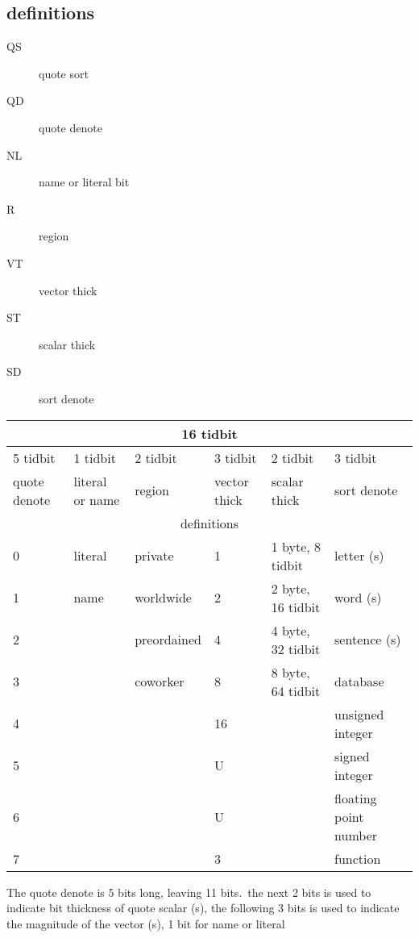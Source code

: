 \subsection{definitions}
\begin{description}
  \item [QS] quote sort 
  \item [QD] quote denote
  \item [NL] name or literal bit
  \item [R] region
  \item [VT] vector thick
  \item [ST] scalar thick
  \item [SD] sort denote
\end{description}

\begin{tabular}{*{6}{l}}
\toprule
\multicolumn{6}{|c|}{16 tidbit}\\
\midrule
5 tidbit     & 1 tidbit & 2 tidbit            & 3 tidbit        & 2 tidbit & 3 tidbit \\
\midrule
quote denote & literal or name & region & vector thick & scalar thick & sort denote \\
\midrule
\midrule
\multicolumn{6}{|c|}{definitions}\\
\bottomrule
0            & literal& private  & 1  & 1 byte, 8 tidbit      & letter (s) \\
1            & name   & worldwide    & 2 & 2 byte, 16 tidbit     & word (s) \\
2            &        & preordained  & 4 & 4 byte, 32 tidbit     & sentence (s) \\
3            &        & coworker & 8     & 8 byte, 64 tidbit     & database \\
4            &         & & 16                                  & & unsigned integer \\
5            &         & & U                                   & & signed integer \\
6            &         & & U                                   & & floating point number \\
7            &         & & 3                                   & & function \\
\bottomrule
\end{tabular}
The quote denote is 5 bits long, leaving 11 bits.\
the next 2 bits is used to indicate bit thickness of quote scalar (s),
the following 3 bits is used to indicate the magnitude of the vector (s),
1 bit for name or literal
